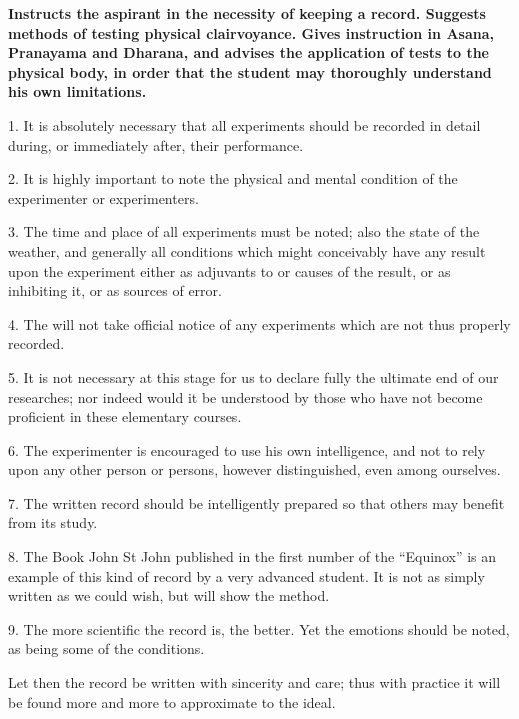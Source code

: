 \textbf{Instructs the aspirant in the necessity of keeping a record. Suggests methods of testing physical clairvoyance. Gives instruction in Asana, Pranayama and Dharana, and advises the application of tests to the physical body, in order that the student may thoroughly understand his own limitations.}



1. It is absolutely necessary that all experiments should be recorded in detail during, or immediately after, their performance.

2. It is highly important to note the physical and mental condition of the experimenter or experimenters.

3. The time and place of all experiments must be noted; also the state of the weather, and generally all conditions which might conceivably have any result upon the experiment either as adjuvants to or causes of the result, or as inhibiting it, or as sources of error.

4. The \Argentium{} will not take official notice of any experiments which are not thus properly recorded.

5. It is not necessary at this stage for us to declare fully the ultimate end of our researches; nor indeed would it be understood by those who have not become proficient in these elementary courses.

6. The experimenter is encouraged to use his own intelligence, and not to rely upon any other person or persons, however distinguished, even among ourselves.

7. The written record should be intelligently prepared so that others may benefit from its study.

8. The Book John St John published in the first number of the \enquote{Equinox} is an example of this kind of record by a very advanced student. It is not as simply written as we could wish, but will show the method.

9. The more scientific the record is, the better. Yet the emotions should be noted, as being some of the conditions.

Let then the record be written with sincerity and care; thus with practice it will be found more and more to approximate to the ideal.



